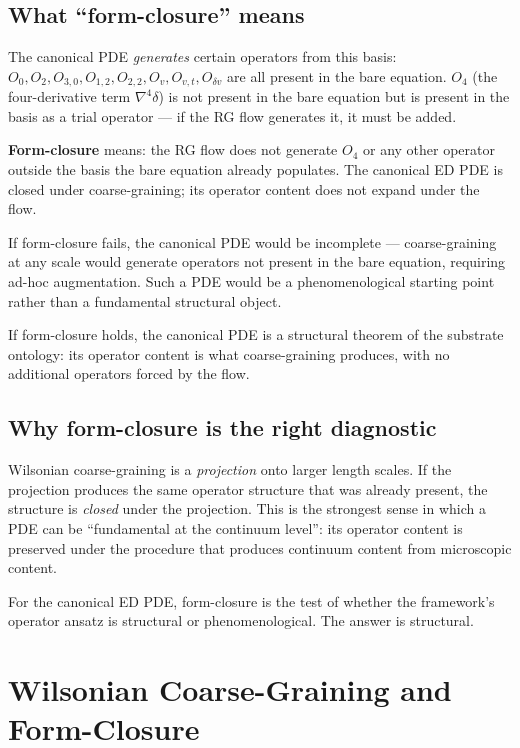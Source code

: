 \documentclass[11pt,a4paper]{article}
\begin{document}
\subsection{What ``form-closure'' means}

The canonical PDE \emph{generates} certain operators from this basis: $O_0, O_2, O_{3,0}, O_{1,2}, O_{2,2}, O_v, O_{v,t}, O_{\delta v}$ are all present in the bare equation. $O_4$ (the four-derivative term $\nabla^4 \delta$) is not present in the bare equation but is present in the basis as a trial operator --- if the RG flow generates it, it must be added.

\textbf{Form-closure} means: the RG flow does not generate $O_4$ or any other operator outside the basis the bare equation already populates. The canonical ED PDE is closed under coarse-graining; its operator content does not expand under the flow.

If form-closure fails, the canonical PDE would be incomplete --- coarse-graining at any scale would generate operators not present in the bare equation, requiring ad-hoc augmentation. Such a PDE would be a phenomenological starting point rather than a fundamental structural object.

If form-closure holds, the canonical PDE is a structural theorem of the substrate ontology: its operator content is what coarse-graining produces, with no additional operators forced by the flow.

\subsection{Why form-closure is the right diagnostic}

Wilsonian coarse-graining is a \emph{projection} onto larger length scales. If the projection produces the same operator structure that was already present, the structure is \emph{closed} under the projection. This is the strongest sense in which a PDE can be ``fundamental at the continuum level'': its operator content is preserved under the procedure that produces continuum content from microscopic content.

For the canonical ED PDE, form-closure is the test of whether the framework's operator ansatz is structural or phenomenological. The answer is structural.

\section{Wilsonian Coarse-Graining and Form-Closure}
\end{document}
